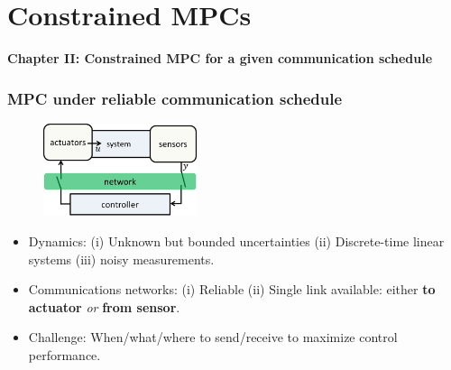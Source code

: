 \documentclass{beamer}
\begin{document}
\section{Constrained MPCs}
\begin{frame}
\centerline{\textbf{Chapter II: Constrained MPC for a given communication schedule}
}
\end{frame}
\begin{frame}
 \frametitle{MPC under reliable communication schedule}
 \begin{figure}
\centering
\includegraphics[width=0.4\textwidth, height = .25\textheight]{clc.png}
\end{figure}
 \begin{itemize}
  \item Dynamics: (i) Unknown but bounded uncertainties (ii) Discrete-time linear systems (iii) noisy measurements.
  \item Communications networks: (i) Reliable (ii) Single link available: either \textbf{to actuator} \textit{or}
  \textbf{from sensor}.
  \item Challenge: When/what/where to send/receive to maximize control performance.
 \end{itemize}
\end{frame}
\end{document}
